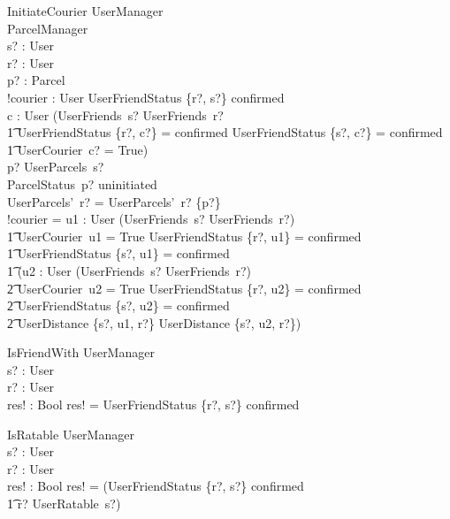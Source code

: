 \documentclass{article}
\begin{document}
\begin{schema}{InitiateCourier}
	\Delta UserManager\\
	\Delta ParcelManager\\
	s? : User\\
	r? : User\\
	p? : Parcel\\
	!courier : User
	\where
	UserFriendStatus \{r?, s?\} \mapsto confirmed\\
	\exists c : User \in (UserFriends~s? \cap UserFriends~r? \land\\
	\t1 UserFriendStatus \{r?, c?\} = confirmed \land UserFriendStatus \{s?, c?\} = confirmed \land\\
	\t1 UserCourier~c? = True)\\
	p? \in UserParcels~s?\\
	ParcelStatus~p? \mapsto uninitiated\\
	UserParcels'~r? = UserParcels'~r? \cup \{p?\}\\
	
	
	
	!courier = u1 : User \in (UserFriends~s? \cap UserFriends~r?) \land\\
	\t1 UserCourier~u1 = True \land UserFriendStatus \{r?, u1\} = confirmed \land\\
	\t1 UserFriendStatus \{s?, u1\} = confirmed \land\\
	\t1 (\forall u2 : User \in (UserFriends~s? \cap UserFriends~r?) \land\\
	\t2 UserCourier~u2 = True \land UserFriendStatus \{r?, u2\} = confirmed \land\\
	\t2 UserFriendStatus \{s?, u2\} = confirmed \land\\
	\t2 UserDistance \{s?, u1, r?\} \leq UserDistance \{s?, u2, r?\})
\end{schema}

\begin{schema}{IsFriendWith}
	\Delta UserManager\\
	s? : User\\
	r? : User\\
	res! : Bool
	\where
	res! = UserFriendStatus \{r?, s?\} \mapsto confirmed\\
\end{schema}

\begin{schema}{IsRatable}
	\Delta UserManager\\
	s? : User\\
	r? : User\\
	res! : Bool
	\where
	res! = (UserFriendStatus \{r?, s?\} \mapsto confirmed \land\\
	\t1 r? \inbag UserRatable~s?)
\end{schema}
\end{document}
